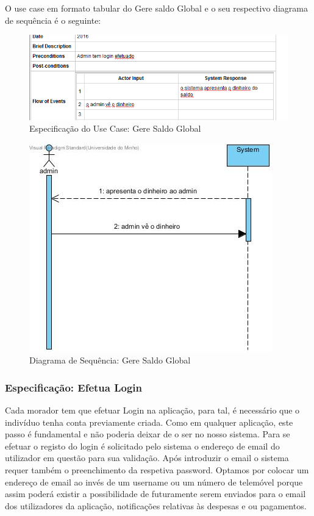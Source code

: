 O use case em formato tabular do Gere saldo Global e o seu respectivo diagrama de sequência é o seguinte:

\begin{figure}[htb!]
	\centering
	\includegraphics[scale=0.6]{imagens/Especificacoes/geresaldoglobal}  
	\caption{Especificação do Use Case: Gere Saldo Global  }  
\end{figure}

\begin{figure}[htb!]
	\centering
	\includegraphics[scale=0.5]{imagens/diagramaSeq/GereSaldoGlobal}  
	\caption{Diagrama de Sequência: Gere Saldo Global}  
\end{figure}


\subsubsection{Especificação: Efetua Login }
Cada morador tem que efetuar Login na aplicação, para tal, é necessário que o indivíduo tenha conta previamente criada. Como em qualquer aplicação, este passo é fundamental e não poderia deixar de o ser no nosso sistema. Para se efetuar o registo do login é solicitado pelo sistema o endereço de email do utilizador em questão para sua validação. Após introduzir o email o sistema requer também o preenchimento da respetiva password. Optamos por colocar um endereço de email ao invés de um username ou um número de telemóvel porque assim poderá existir a possibilidade de futuramente serem enviados para o email dos utilizadores da aplicação, notificações relativas às despesas e ou pagamentos.

